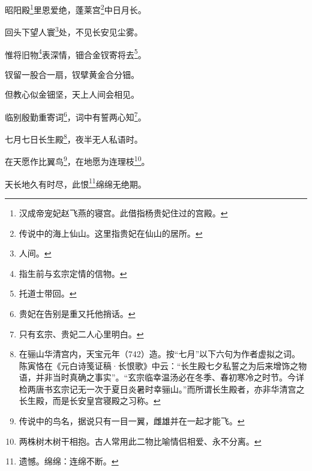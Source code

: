 \documentclass{article}
\begin{document}
昭阳殿\footnote{汉成帝宠妃赵飞燕的寝宫。此借指杨贵妃住过的宫殿。}里恩爱绝，蓬莱宫\footnote{传说中的海上仙山。这里指贵妃在仙山的居所。}中日月长。

回头下望人寰\footnote{人间。}处，不见长安见尘雾。

惟将旧物\footnote{指生前与玄宗定情的信物。}表深情，钿合金钗寄将去\footnote{托道士带回。}。

钗留一股合一扇，钗擘黄金合分钿。

但教心似金钿坚，天上人间会相见。

临别殷勤重寄词\footnote{贵妃在告别是重又托他捎话。}，词中有誓两心知\footnote{只有玄宗、贵妃二人心里明白。}。

七月七日长生殿\footnote{在骊山华清宫内，天宝元年（742）造。按“七月”以下六句为作者虚拟之词。陈寅恪在《元白诗笺证稿·长恨歌》中云：“长生殿七夕私誓之为后来增饰之物语，并非当时真确之事实”。“玄宗临幸温汤必在冬季、春初寒冷之时节。今详检两唐书玄宗记无一次于夏日炎暑时幸骊山。”而所谓长生殿者，亦非华清宫之长生殿，而是长安皇宫寝殿之习称。}，夜半无人私语时。

在天愿作比翼鸟\footnote{传说中的鸟名，据说只有一目一翼，雌雄并在一起才能飞。}，在地愿为连理枝\footnote{两株树木树干相抱。古人常用此二物比喻情侣相爱、永不分离。}。

天长地久有时尽，此恨\footnote{遗憾。绵绵：连绵不断。}绵绵无绝期。
\end{document}
